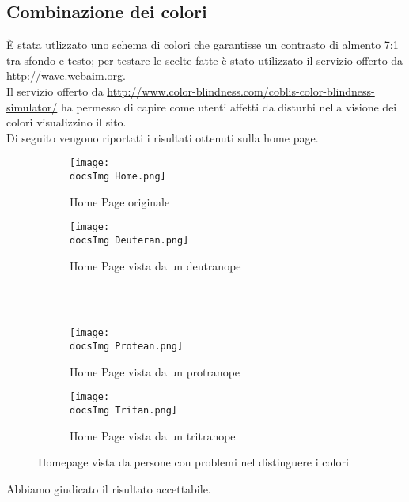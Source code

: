 {	\subsection{Combinazione dei colori}{
		È stata utlizzato uno schema di colori che garantisse un contrasto di almento 7:1 tra sfondo e testo; per testare le scelte fatte è stato utilizzato il servizio offerto da \url{http://wave.webaim.org}.\\
		Il servizio offerto da \url{http://www.color-blindness.com/coblis-color-blindness-simulator/} ha permesso di capire come utenti affetti da disturbi nella visione dei colori visualizzino il sito.\\
		Di seguito vengono riportati i risultati ottenuti sulla home page.
		\begin{figure}[H]
			\begin{subfigure}[b]{0.5\textwidth}
				\texttt{[image: \\docsImg Home.png]}
				\caption{Home Page originale}
				\label{Home Page originale}
			\end{subfigure}
			\begin{subfigure}[b]{0.5\textwidth}
				\texttt{[image: \\docsImg Deuteran.png]}
				\caption{Home Page vista da un deutranope}
				\label{Home Page vista da un deutranope}
			\end{subfigure}
			\\
			\\
			\begin{subfigure}[b]{0.5\textwidth}
				\texttt{[image: \\docsImg Protean.png]}
				\caption{Home Page vista da un protranope}
				\label{Home Page vista da un protranope}
			\end{subfigure}
			\begin{subfigure}[b]{0.5\textwidth}
			\texttt{[image: \\docsImg Tritan.png]}
				\caption{Home Page vista da un tritranope}
				\label{Home Page vista da un tritranope}
			\end{subfigure}
			\caption{Homepage vista da persone con problemi nel distinguere i colori}
			\label{fig: Homepage vista da persone con problemi nel distinguere i colori}
		\end{figure}
		Abbiamo giudicato il risultato accettabile.
	}
}
